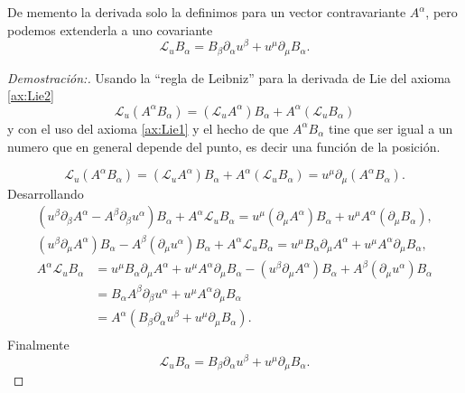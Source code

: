 \noindent De memento la derivada solo la definimos para un vector contravariante $A^\alpha$, pero podemos extenderla a uno covariante
\begin{equation}
    \boxed{\mathscr{L}_u B_\alpha=B_\beta \partial_\alpha u^\beta+u^\mu \partial_\mu B_\alpha .}
\end{equation}
\begin{proof}[Demostración:]
    Usando la  ``regla de Leibniz'' para la derivada de Lie del axioma \ref{ax:Lie2}
    \begin{equation}
        \mathscr{L}_u\left(A^\alpha B_\alpha\right)=\left(\mathscr{L}_u A^\alpha\right) B_{\alpha} + A^\alpha \left(\mathscr{L}_u B_\alpha\right)
    \end{equation}
    y con el uso del axioma \ref{ax:Lie1} y el hecho de que $A^\alpha B_\alpha$ tine que ser igual a un numero que en general depende del punto, es decir una función de la posición.

    \begin{equation}
        \mathscr{L}_u\left(A^\alpha B_\alpha\right)=\left(\mathscr{L}_u A^\alpha\right) B_\alpha+A^\alpha\left(\mathscr{L}_u B_\alpha\right)=u^\mu \partial_\mu\left(A^\alpha B_\alpha\right).
    \end{equation}
    Desarrollando
    \begin{align*}
        \left(u^\beta \partial_\beta A^\alpha-A^\beta \partial_\beta u^\alpha\right) B_\alpha+A^\alpha \mathscr{L}_u B_\alpha=u^\mu\left(\partial_\mu A^\alpha\right) B_\alpha+u^\mu A^\alpha (\partial_\mu B_\alpha ),\\
        \left(u^\beta \partial_\mu A^\alpha\right) B_\alpha-A^\beta\left(\partial_\mu u^\alpha\right) B_\alpha+A^\alpha \mathscr{L}_u B_\alpha=u^\mu B_\alpha \partial_\mu A^\alpha+u^\mu A^\alpha \partial_\mu B_\alpha,
    \end{align*}
    \begin{align*}
        A^\alpha \mathscr{L}_u B_\alpha   & =  u^\mu B_\alpha \partial_\mu A^\alpha+u^\mu A^\alpha \partial_\mu B_\alpha  - \left(u^\beta \partial_\mu A^\alpha\right) B_\alpha + A^\beta\left(\partial_\mu u^\alpha\right) B_\alpha \\
        & = B_\alpha A^\beta \partial_\beta u^\alpha+u^\mu A^\alpha \partial_\mu B_\alpha\\
        & = A^\alpha\left(B_\beta \partial_\alpha u^\beta+u^\mu \partial_\mu B_\alpha\right).\\
    \end{align*}
    Finalmente
    \begin{equation}
        \mathscr{L}_u B_\alpha  = B_\beta \partial_\alpha u^\beta+u^\mu \partial_\mu B_\alpha.
    \end{equation}
\end{proof}



